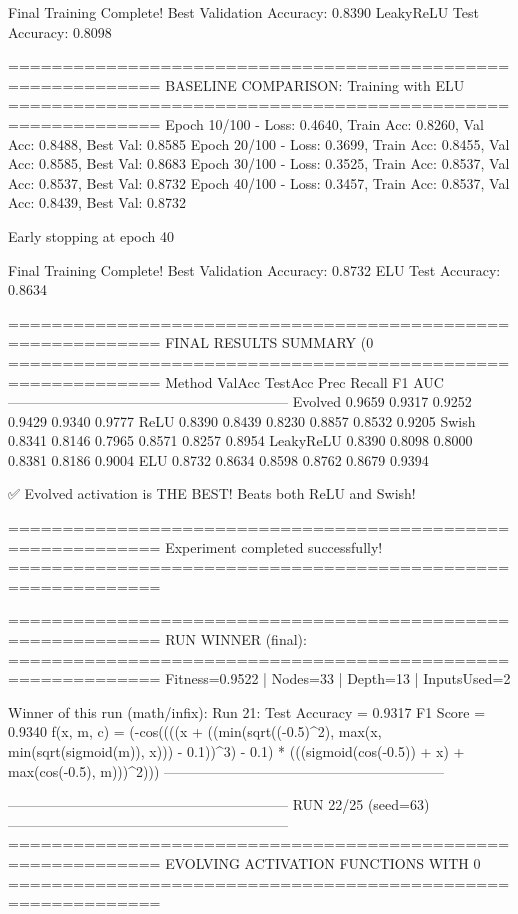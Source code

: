 Final Training Complete!
Best Validation Accuracy: 0.8390
LeakyReLU Test Accuracy: 0.8098

============================================================
BASELINE COMPARISON: Training with ELU
============================================================
Epoch  10/100 - Loss: 0.4640, Train Acc: 0.8260, Val Acc: 0.8488, Best Val: 0.8585
Epoch  20/100 - Loss: 0.3699, Train Acc: 0.8455, Val Acc: 0.8585, Best Val: 0.8683
Epoch  30/100 - Loss: 0.3525, Train Acc: 0.8537, Val Acc: 0.8537, Best Val: 0.8732
Epoch  40/100 - Loss: 0.3457, Train Acc: 0.8537, Val Acc: 0.8439, Best Val: 0.8732

Early stopping at epoch 40

Final Training Complete!
Best Validation Accuracy: 0.8732
ELU Test Accuracy: 0.8634

============================================================
FINAL RESULTS SUMMARY (0%
============================================================
Method             ValAcc     TestAcc    Prec       Recall     F1         AUC
------------------------------------------------------------
Evolved            0.9659     0.9317     0.9252     0.9429     0.9340     0.9777
ReLU               0.8390     0.8439     0.8230     0.8857     0.8532     0.9205
Swish              0.8341     0.8146     0.7965     0.8571     0.8257     0.8954
LeakyReLU          0.8390     0.8098     0.8000     0.8381     0.8186     0.9004
ELU                0.8732     0.8634     0.8598     0.8762     0.8679     0.9394

✅ Evolved activation is THE BEST! Beats both ReLU and Swish!

============================================================
Experiment completed successfully!
============================================================

============================================================
RUN WINNER (final):
============================================================
Fitness=0.9522 | Nodes=33 | Depth=13 | InputsUsed=2

Winner of this run (math/infix):
  Run 21:
     Test Accuracy = 0.9317
     F1 Score      = 0.9340
     f(x, m, c)    = (-cos((((x + ((min(sqrt((-0.5)^2), max(x, min(sqrt(sigmoid(m)), x))) - 0.1))^3) - 0.1) * (((sigmoid(cos(-0.5)) + x) + max(cos(-0.5), m)))^2)))
------------------------------------------------------------

------------------------------------------------------------
RUN 22/25 (seed=63)
------------------------------------------------------------
============================================================
EVOLVING ACTIVATION FUNCTIONS
WITH 0%
============================================================

